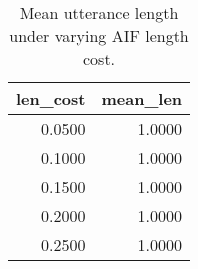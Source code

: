 \begin{table}[!ht]
\centering
\begin{table}
\caption{Mean utterance length under varying AIF length cost.}
\label{tab:fig09}
\begin{tabular}{rr}
\toprule
len\_cost & mean\_len \\
\midrule
0.0500 & 1.0000 \\
0.1000 & 1.0000 \\
0.1500 & 1.0000 \\
0.2000 & 1.0000 \\
0.2500 & 1.0000 \\
\bottomrule
\end{tabular}
\end{table}
\end{table}
